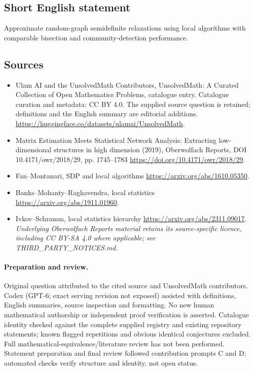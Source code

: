 \documentclass[11pt]{article}
\begin{document}
\subsection{Short English statement}
Approximate random-graph semidefinite relaxations using local algorithms with comparable bisection and community-detection performance.
\subsection{Sources}
\begin{itemize}
\item[\hypertarget{source:statement:1}{S1}] Ulam AI and the UnsolvedMath Contributors, UnsolvedMath: A Curated Collection of Open Mathematics Problems, catalogue entry. Catalogue curation and metadata: CC BY 4.0. The supplied source question is retained; definitions and the English summary are editorial additions.
\url{https://huggingface.co/datasets/ulamai/UnsolvedMath}.
\item[\hypertarget{source:statement:2}{S2}] Matrix Estimation Meets Statistical Network Analysis: Extracting low-dimensional structures in high dimension (2019), Oberwolfach Reports, DOI 10.4171/owr/2018/29, pp. 1745--1783
\url{https://doi.org/10.4171/owr/2018/29}.
\item[\hypertarget{source:statement:3}{S3}] Fan--Montanari, SDP and local algorithms
\url{https://arxiv.org/abs/1610.05350}.
\item[\hypertarget{source:statement:4}{S4}] Banks--Mohanty--Raghavendra, local statistics
\url{https://arxiv.org/abs/1911.01960}.
\item[\hypertarget{source:statement:5}{S5}] Ivkov--Schramm, local statistics hierarchy
\url{https://arxiv.org/abs/2311.09017}.
\textit{Underlying Oberwolfach Reports material retains its source-specific licence, including CC BY-SA 4.0 where applicable; see THIRD\_PARTY\_NOTICES.md.}
\end{itemize}
\paragraph{Preparation and review.}
Original question attributed to the cited source and UnsolvedMath contributors. Codex (GPT-6; exact serving revision not exposed) assisted with definitions, English summaries, source inspection and formatting. No new human mathematical authorship or independent proof verification is asserted. Catalogue identity checked against the complete supplied registry and existing repository statements; known flagged repetitions and obvious identical conjectures excluded. Full mathematical-equivalence/literature review has not been performed. Statement preparation and final review followed contribution prompts C and D; automated checks verify structure and identity, not open status.
\label{end:statement}
\end{document}
